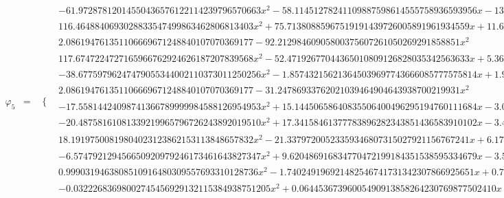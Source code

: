 \documentclass{article}
\begin{document}
\begin{landscape}
\begin{eqnarray*}
\begin{array}{cc}
\end{array}\\
\varphi_5 & = & \begin{array}{cc}
 \{ & 
\begin{array}{cc}
 -61.97287812014550436576122114239796570663 x^2-58.11451278241109887598614555758936593956 x-13.42629992931732104924487322649305085510 & x\geq -\frac{1}{2}\land x<-\frac{3}{8} \\
 116.4648840693028833547499863462806813403 x^2+75.71380885967519191439726005891961934559 x+11.66651037857385847395201532660238388586 & x\geq -\frac{3}{8}\land x<-\frac{1}{4} \\
 2.086194761351106669671248840107070369177-92.21298460905800375607261050269291858851 x^2 & x\geq 0\land x<\frac{1}{8} \\
 117.6747224727165966762924626187207839568 x^2-52.47192677044365010809126828035342563633 x+5.365690184503834801426953107629159471448 & x\geq \frac{1}{8}\land x<\frac{1}{4} \\
 -38.67759796247479055344002110373011250256 x^2-1.857432156213645039697743666085777575814 x+1.970105251587753854690139860976709270689 & x\geq -\frac{1}{4}\land x<-\frac{1}{8} \\
 2.086194761351106669671248840107070369177-31.24786933762021039464904643938700219931 x^2 & x\geq -\frac{1}{8}\land x<0 \\
 -17.55814424098741366789999984588126954953 x^2+15.14450658640835506400496295194760111684 x-3.086363985102665845085075796408468872698 & x\geq \frac{1}{4}\land x<\frac{3}{8} \\
 -20.48758161081339219965796726243892019510 x^2+17.34158461377783896282343851436583910102 x-3.498316115234444076113539964361888494732 & x\geq \frac{3}{8}\land x<\frac{1}{2} \\
 18.19197500819804023123862153113848657832 x^2-21.33797200523359346807315027921156767241 x+6.171573039518414031610607234032463198625 & x\geq \frac{1}{2}\land x<\frac{5}{8} \\
 -6.574792129456650920979246173461643827347 x^2+9.620486916834770472199184351538595334679 x-3.502945373627949699724497338076962741091 & x\geq \frac{5}{8}\land x<\frac{3}{4} \\
 0.9990319463808510916480309557693310128736 x^2-1.740249196921482546741731342307866925651 x+0.7573306690306451823783460471154606065332 & x\geq \frac{3}{4}\land x<\frac{7}{8} \\
 -0.03222683698002745456929132115384938751205 x^2+0.06445367396005490913858264230769877502410 x-0.03222683698002745456929132115384938751205 & x\geq \frac{7}{8}\land x<1 \\

\end{array}
\end{array}
\end{eqnarray*}
\end{landscape}
\end{document}
